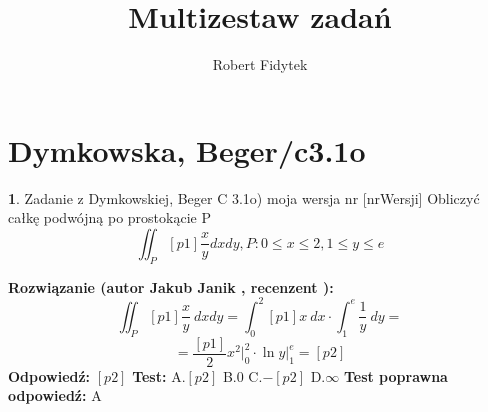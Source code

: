 \documentclass[12pt, a4paper]{article}
\title{Multizestaw zadań}
\author{Robert Fidytek}
\date{}
\theoremstyle{definition} %
\newtheorem{zad}{}
\newcommand{\kategoria}[1]{\section{#1}} %
\newcommand{\zadStart}[1]{\begin{zad}#1\newline} %
\newcommand{\zadStop}{\end{zad}}   %
\newcommand{\rozwStart}[2]{\noindent \textbf{Rozwiązanie (autor #1 , recenzent #2): }\newline} %
\newcommand{\rozwStop}{\newline}                                            %
\newcommand{\odpStart}{\noindent \textbf{Odpowiedź:}\newline}    %
\newcommand{\odpStop}{\newline}                                             %
\newcommand{\testStart}{\noindent \textbf{Test:}\newline} %
\newcommand{\testStop}{\newline} %
\newcommand{\kluczStart}{\noindent \textbf{Test poprawna odpowiedź:}\newline} %
\newcommand{\kluczStop}{\newline} %
\begin{document}
\maketitle


\kategoria{Dymkowska, Beger/c3.1o}
\zadStart{Zadanie z Dymkowskiej, Beger C 3.1o) moja wersja nr [nrWersji]}
Obliczyć całkę podwójną po prostokącie P $$\iint_P [p1]\frac{x}{y} dxdy, P: 0\leq x \leq 2, 1 \leq y \leq e$$
\zadStop
\rozwStart{Jakub Janik}{}
$$\iint_P [p1]\frac{x}{y}\ dxdy=\int_0^{2}[p1]x\ dx \cdot \int_1^{e}\frac{1}{y}\ dy=$$
$$=\frac{[p1]}{2}x^2\Big|_0^2\cdot\ln{y}\Big|_1^{e}=[p2]$$
\rozwStop
\odpStart
$[p2]$
\odpStop
\testStart
A.$[p2]$
B.$0$
C.$-[p2]$
D.$\infty$
\testStop
\kluczStart
A
\kluczStop
\end{document}
